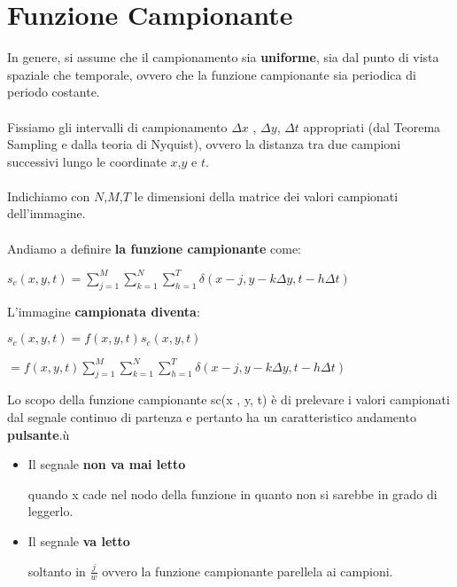\section{Funzione Campionante}
In genere, si assume che il campionamento sia \textbf{uniforme}, sia dal punto di vista spaziale che temporale, ovvero che la funzione campionante sia periodica di periodo costante.
\\\\Fissiamo gli intervalli di campionamento $\Delta x$ , $\Delta y$, $\Delta t$ appropriati (dal Teorema Sampling e dalla teoria di Nyquist), ovvero la
distanza tra due campioni successivi lungo le coordinate $x$,$y$ e $t$.
\\\\Indichiamo con $N$,$M$,$T$ le dimensioni della matrice dei valori campionati dell’immagine.
\\\\Andiamo a definire \textbf{la funzione campionante} come:
\begin{center}
    $s_c(x,y,t) = \sum_{j=1}^{M} \sum_{k=1}^{N}\sum_{h=1}^{T} \delta (x-j, y - k \Delta y, t - h  \Delta t )$
\end{center}
L'immagine \textbf{campionata diventa}:
\begin{center}
    $s_c(x,y,t) = f(x,y,t)s_c(x,y,t)$
\end{center}
\begin{center}
    $= f(x,y,t) \sum_{j=1}^{M} \sum_{k=1}^{N}\sum_{h=1}^{T} \delta (x-j, y - k \Delta y, t - h  \Delta t )$
\end{center}
Lo scopo della funzione campionante sc(x , y, t) è di prelevare i
valori campionati dal segnale continuo di partenza e pertanto ha
un caratteristico andamento \textbf{pulsante}.ù
\begin{itemize}
    \item Il segnale \textbf{non va mai letto}

          quando x cade nel nodo della funzione in quanto non si sarebbe in grado di leggerlo.

    \item Il segnale \textbf{va letto}

          soltanto in $\frac{j}{w}$ ovvero la funzione campionante parellela ai campioni.
\end{itemize}

